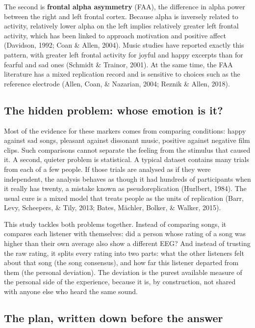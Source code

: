 \documentclass[11pt,a4paper]{article}
\begin{document}
The second is \textbf{frontal alpha asymmetry} (FAA), the difference in alpha power between the right and left frontal cortex. Because alpha is inversely related to activity, relatively lower alpha on the left implies relatively greater left frontal activity, which has been linked to approach motivation and positive affect (Davidson, 1992; Coan \& Allen, 2004). Music studies have reported exactly this pattern, with greater left frontal activity for joyful and happy excerpts than for fearful and sad ones (Schmidt \& Trainor, 2001). At the same time, the FAA literature has a mixed replication record and is sensitive to choices such as the reference electrode (Allen, Coan, \& Nazarian, 2004; Reznik \& Allen, 2018).

\subsection{The hidden problem: whose emotion is it?}

Most of the evidence for these markers comes from comparing conditions: happy against sad songs, pleasant against dissonant music, positive against negative film clips. Such comparisons cannot separate the feeling from the stimulus that caused it. A second, quieter problem is statistical. A typical dataset contains many trials from each of a few people. If those trials are analysed as if they were independent, the analysis behaves as though it had hundreds of participants when it really has twenty, a mistake known as pseudoreplication (Hurlbert, 1984). The usual cure is a mixed model that treats people as the units of replication (Barr, Levy, Scheepers, \& Tily, 2013; Bates, M\"achler, Bolker, \& Walker, 2015).

This study tackles both problems together. Instead of comparing songs, it compares each listener with themselves: did a person whose rating of a song was higher than their own average also show a different EEG? And instead of trusting the raw rating, it splits every rating into two parts: what the other listeners felt about that song (the song consensus), and how far this listener departed from them (the personal deviation). The deviation is the purest available measure of the personal side of the experience, because it is, by construction, not shared with anyone else who heard the same sound.

\subsection{The plan, written down before the answer}
\end{document}
